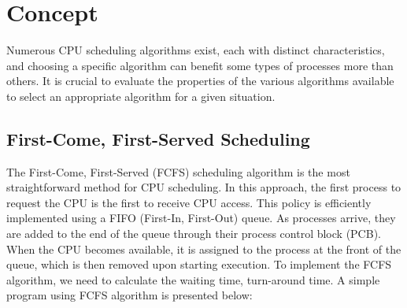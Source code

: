 \documentclass[conference]{IEEEtran}
\begin{document}
\section{\textbf{Concept}}
Numerous CPU scheduling algorithms exist, each with distinct characteristics, and choosing a specific algorithm can benefit some types of processes more than others. It is crucial to evaluate the properties of the various algorithms available to select an appropriate algorithm for a given situation.
\subsection{First-Come, First-Served Scheduling}
The First-Come, First-Served (FCFS) scheduling algorithm is the most straightforward method for CPU scheduling\cite{goel2013comparative}. In this approach, the first process to request the CPU is the first to receive CPU access. This policy is efficiently implemented using a FIFO (First-In, First-Out) queue. As processes arrive, they are added to the end of the queue through their process control block (PCB). When the CPU becomes available, it is assigned to the process at the front of the queue, which is then removed upon starting execution\cite{silberschatz1991operating}. To implement the FCFS algorithm, we need to calculate the waiting time, turn-around time. A simple program using FCFS algorithm is presented below:
\end{document}
